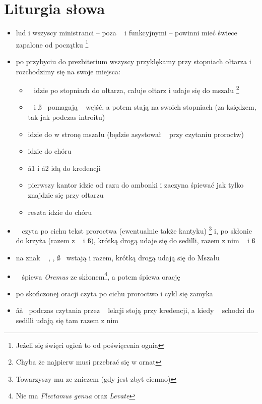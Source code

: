 \section{Liturgia słowa}

\begin{itemize}
	\item lud i wszyscy ministranci -- poza \ii~ i funkcyjnymi -- powinni mieć
	      świece zapalone od początku \footnote{Jeżeli się święci ogień to od
		      poświęcenia ognia}
	\item po przybyciu do prezbiterium wszyscy przyklękamy przy stopniach
	      ołtarza i rozchodzimy się na swoje miejsca:
	      \begin{itemize}
		      \item \ii~ idzie po stopniach do ołtarza, całuje ołtarz i udaje
		            się do mszału \footnote{Chyba że najpierw musi przebrać się
			            w ornat}
		      \item \dd~ i \ss~ pomagają \ii~ wejść, a potem stają na swoich
		            stopniach (za księdzem, tak jak podczas introitu)
		      \item {} idzie do w stronę mszału (będzie asystował \ii~ przy
		            czytaniu proroctw)
		      \item {} idzie do chóru
		      \item \aa1 i \aa2 idą do kredencji
		      \item pierwszy kantor idzie od razu do ambonki i zaczyna śpiewać
		            jak tylko \ii~ znajdzie się przy ołtarzu
		      \item reszta idzie do chóru
	      \end{itemize}
	\item \ii~ czyta po cichu tekst proroctwa (ewentualnie także kantyku)
	      \footnote{Towarzyszy mu  ze zniczem (gdy jest zbyt ciemno)} i, po
	      skłonie do krzyża (razem z \dd~ i \ss), krótką drogą udaje się do
	      sedilli, razem z nim \dd~ i \ss
	\item na znak ~ \ii, \dd, \ss~ wstają i razem, krótką drogą udają się do Mszału
	\item \ii~ śpiewa \textit{Oremus} ze skłonem\footnote{Nie ma
		      \textit{Flectamus genua} oraz \textit{Levate}}, a potem śpiewa
	      orację
	\item po skończonej oracji czyta po cichu proroctwo i cykl się zamyka
	\item \aa\aa~ podczas czytania przez \ii~ lekcji stoją przy kredencji, a
	      kiedy \ii~ schodzi do sedilli udają się tam razem z nim

\end{itemize}
